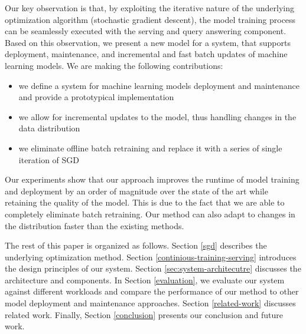 \documentclass{vldb}
\begin{document}
Our key observation is that, by exploiting the iterative nature of the underlying optimization algorithm (stochastic gradient descent), the model training process can be seamlessly executed with the serving and query answering component.
Based on this observation, we present a new model for a system, that supports deployment, maintenance, and incremental and fast batch updates of machine learning models.
We are making the following contributions: 
\begin{itemize}
\item we define a system for machine learning models deployment and maintenance and provide a prototypical implementation
\item we allow for incremental updates to the model, thus handling changes in the data distribution
\item we eliminate offline batch retraining and replace it with a series of single iteration of SGD
\end{itemize}
Our experiments show that our approach improves the runtime of model training and deployment by an order of magnitude over the state of the art while retaining the quality of the model. 
This is due to the fact that we are able to completely eliminate batch retraining. 
Our method can also adapt to changes in the distribution faster than the existing methods.

The rest of this paper is organized as follows. 
Section \ref{sgd} describes the underlying optimization method.
Section \ref{continious-training-serving} introduces the design principles of our system. 
Section \ref{sec:system-architecutre} discusses the architecture and components.
In Section \ref{evaluation}, we evaluate our system against different workloads and compare the performance of our method to other model deployment and maintenance approaches. 
Section \ref {related-work} discusses related work.
Finally, Section \ref{conclusion} presents our conclusion and future work.
\end{document}
